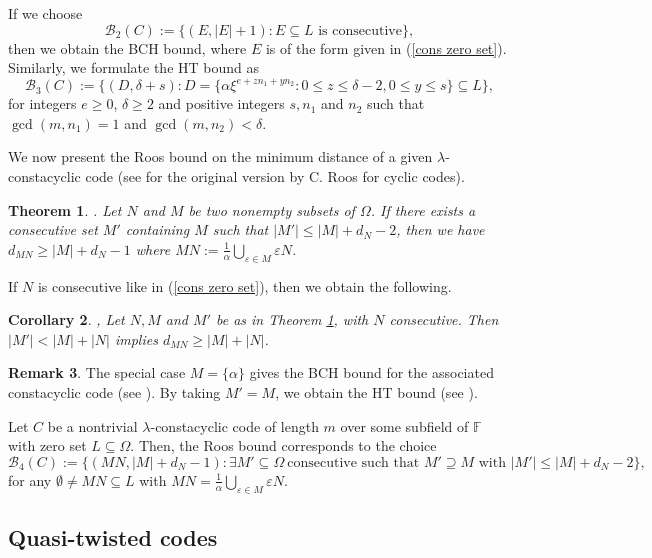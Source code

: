 \documentclass[11pt]{amsart}
\theoremstyle{plain}
\newtheorem{thm}{Theorem}[section]
\newtheorem{cor}[thm]{Corollary}
\theoremstyle{definition}
\newtheorem{rem}[thm]{Remark}
\numberwithin{equation}{section}
\newcommand{\F}{{\mathbb F}}
\begin{document}
If we choose $$\mathcal{B}_2(C) := \{(E, |E|+1) : E\subseteq L \mbox{\ is\ consecutive}\},$$ then we obtain the BCH bound, where $E$ is of the form given in (\ref{cons zero set}). Similarly, we formulate the HT bound as \begin{equation*}\mathcal{B}_3(C) := \{(D, \delta + s) :
D = \{\alpha\xi^{e + z  n_1 + y  n_2} : 0\leq z \leq \delta-2, 0 \leq y\leq s\} \subseteq L\}, \end{equation*} for integers $ e \geq 0$, $\delta \geq 2$ and positive integers $s, n_1$ and $n_2$ such that $\gcd(m, n_1) = 1$ and $\gcd(m, n_2) < \delta$. 

We now present the Roos bound on the minimum distance of a given $\lambda$-constacyclic code (see \cite[Theorem 2]{R2} for the original version by C. Roos for cyclic codes). 

\begin{thm}\cite[Theorem 6]{RZ}. \label{Roos}
Let $N$ and $M$ be two nonempty subsets of $\Omega$. If there exists a consecutive set $M'$ containing $M$ such that $|M'| \leq |M| + d_N -2$, then we have $d_{MN}\geq |M| + d_N -1$ where $MN:=\displaystyle\frac{1}{\alpha}\bigcup_{\varepsilon\in M} \varepsilon N$.
\end{thm}
If $N$ is consecutive like in (\ref{cons zero set}), then we obtain the following.
\begin{cor}\cite[Corollary 1]{RZ},\cite[Corollary 1]{R2} \label{Roos2}
Let $N, M$ and $M'$ be as in Theorem \ref{Roos}, with $N$ consecutive. Then $|M'| < |M| + |N|$ implies $d_{MN}\geq |M| + |N|$.
\end{cor}

\begin{rem}\label{Roos remark}
The special case $M=\{\alpha\}$ gives the BCH bound for the associated constacyclic code (see \cite[Corollary 2]{RZ}). By taking $M'=M$, we obtain the HT bound (see \cite[Corollary 3]{RZ}). 
\end{rem}

Let $C$ be a nontrivial $\lambda$-constacyclic code of length $m$ over some subfield of $\F$ with zero set $L\subseteq \Omega$. Then, the Roos bound corresponds to the choice $$\mathcal{B}_4(C):=\{(MN,|M|+d_N-1) : \exists M'\subseteq\Omega\  \mbox{consecutive\ such\ that\ }  M'\supseteq M  \mbox{\ with\ } |M'|\leq |M|+d_N-2\},$$ for any $\emptyset\neq MN\subseteq L$ with $MN=\frac{1}{\alpha}\bigcup_{\varepsilon\in M} \varepsilon N$. 

\subsection{Quasi-twisted codes} \label{QT sect}\hfill
\end{document}
